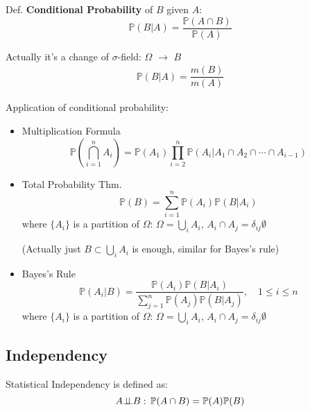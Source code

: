     Def. \textbf{Conditional Probability} of $B$ given $A$:
    \begin{equation}    
        \mathbb{P}(B|A)=\frac{\mathbb{P}(A\cap B)}{\mathbb{P}(A)}    
    \end{equation}

    Actually it's a change of $\sigma$-field: $\Omega$ $ \to $ $B$
    \begin{align}
        \mathbb{P}\left( B|A \right) = \dfrac{m(B)}{m(A)} 
    \end{align}


\begin{point}
    Application of conditional probability:
\end{point}

        \begin{itemize}
        \item Multiplication Formula
        \begin{equation}    
            \mathbb{P}(\bigcap_{i=1}^n A_i)=\mathbb{P}(A_1)\prod_{i=2}^n \mathbb{P}(A_i|A_1\cap A_2\cap \cdots\cap A_{i-1})    
        \end{equation}
        \item Total Probability Thm.
        \begin{equation}    
            \mathbb{P}(B)=\sum_{i=1}^n \mathbb{P}(A_i)\mathbb{P}(B|A_i)  
        \end{equation}
        where $\{A_i\}$ is a partition of $\Omega$: $ \Omega =\bigcup_{i}A_i ,\, A_i\cap A_j=\delta _{ij}\emptyset$

        (Actually just $ B\subset \bigcup_{i}A_i $ is enough, similar for Bayes's rule)
        \item Bayes's Rule
        \begin{equation}    
            \mathbb{P}(A_i|B)=\dfrac{\mathbb{P}(A_i)\mathbb{P}(B|A_i)}{\sum_{j=1}^n\mathbb{P}(A_j)\mathbb{P}(B|A_j)}    ,\quad 1\leq i\leq n
        \end{equation}
        where $\{A_i\}$ is a partition of $\Omega$: $ \Omega =\bigcup_{i}A_i,\, A_i\cap A_j=\delta _{ij}\emptyset $
    \end{itemize}

\subsection{Independency}
    Statistical Independency is defined as:
    \begin{equation}    
        A\bot\!\!\!\bot B:\,\mathbb{P}(A\cap B) =\mathbb{P}(A)\mathbb{P}(B)
    \end{equation}

